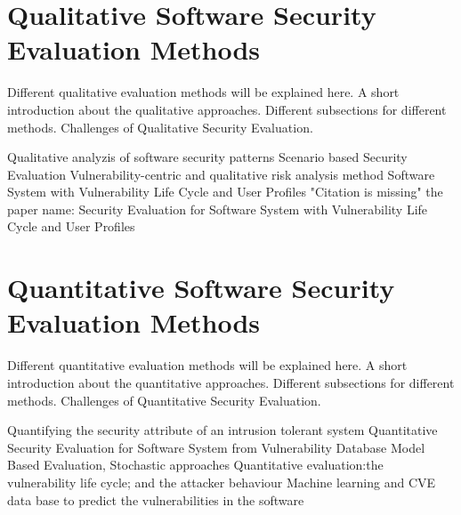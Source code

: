 \documentclass[pdftex,english,oribibl]{llncs}
\begin{document}
\section{Qualitative Software Security Evaluation Methods}
Different qualitative evaluation methods will be explained here.\newline
A short introduction about the qualitative approaches.\newline
Different subsections for different methods.\newline
Challenges of Qualitative Security Evaluation.\newline

	Qualitative analyzis of software security patterns\cite{5564015}\newline
 	Scenario based Security Evaluation\cite{Halkidis:2006:QAS:2639528.2639723}\newline
  	Vulnerability-centric and qualitative risk analysis method\cite{6165757}\newline
  	Software System with Vulnerability Life Cycle and User Profiles\cite{6532147}\newline
  	"Citation is missing" the paper name: Security Evaluation for Software System with Vulnerability Life Cycle and User Profiles\newline
  
\section{Quantitative Software Security Evaluation Methods}
Different quantitative evaluation methods will be explained here.\newline
A short introduction about the quantitative approaches.\newline
Different subsections for different methods.\newline
Challenges of Quantitative Security Evaluation.\newline

  	Quantifying the security attribute of an intrusion tolerant system\cite{1028941}\newline
  	Quantitative Security Evaluation for Software System from Vulnerability Database\cite{Okamura:2013:QSESVD}\newline
 	Model Based Evaluation, Stochastic approaches\cite{1335467}\newline
  	Quantitative evaluation:the vulnerability life cycle; and the attacker behaviour\cite{5315969}\newline
  	Machine learning and CVE data base to predict the vulnerabilities in the software\cite{Jain:2017:CAE:3102980.3102991}\newline
  	
\end{document}
